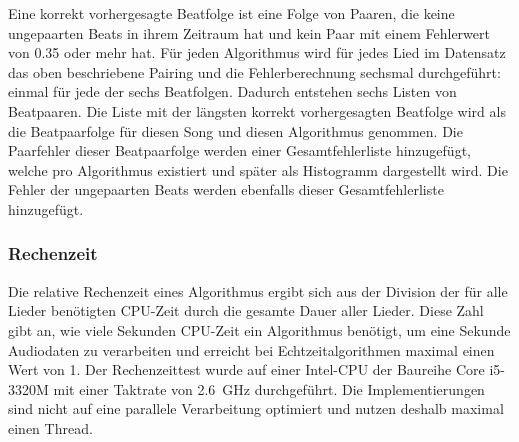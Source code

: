 {{{			%
			Eine korrekt vorhergesagte Beatfolge ist eine Folge von Paaren,
				die keine ungepaarten Beats in ihrem Zeitraum hat und
				kein Paar mit einem Fehlerwert von \num{0.35} oder mehr hat.
			Für jeden Algorithmus wird für jedes Lied im Datensatz das oben beschriebene Pairing und die Fehlerberechnung
				sechsmal durchgeführt:
				einmal für jede der sechs Beatfolgen.
			Dadurch entstehen sechs Listen von Beatpaaren.
			Die Liste mit der längsten korrekt vorhergesagten Beatfolge
				wird als die Beatpaarfolge für diesen Song und diesen Algorithmus genommen.
			Die Paarfehler dieser Beatpaarfolge werden einer Gesamtfehlerliste hinzugefügt,
				welche pro Algorithmus existiert und später als Histogramm dargestellt wird.
			Die Fehler der ungepaarten Beats werden ebenfalls dieser Gesamtfehlerliste hinzugefügt.
		}

		\subsubsection*{\large Rechenzeit}
		{
			Die relative Rechenzeit eines Algorithmus ergibt sich aus der Division der für alle Lieder benötigten \acs{CPU}-Zeit durch die gesamte Dauer aller Lieder.
			Diese Zahl gibt an,
				wie viele Sekunden \acs{CPU}-Zeit ein Algorithmus benötigt,
				um eine Sekunde Audiodaten zu verarbeiten
				und erreicht bei Echtzeitalgorithmen maximal einen Wert von \num{1}.
			Der Rechenzeittest wurde auf einer Intel-\ac{CPU} der Baureihe Core i5-3320M mit einer Taktrate von \SI{2.6}{\giga\hertz} durchgeführt.
			Die Implementierungen sind nicht auf eine parallele Verarbeitung optimiert
				und nutzen deshalb maximal einen Thread.
		}
	}
}
